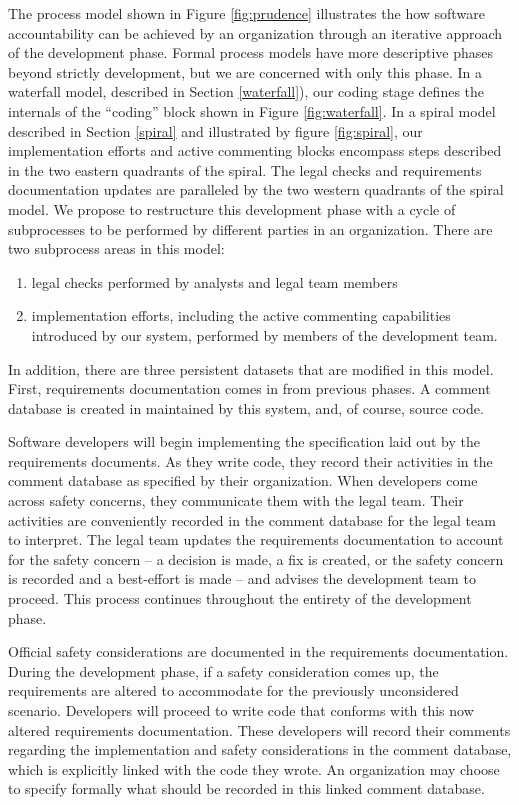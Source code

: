 The process model shown in Figure \ref{fig:prudence} illustrates the how
software accountability can be achieved by an organization through an iterative
approach of the development phase. Formal process models have more
descriptive phases beyond strictly development, but we are concerned with only
this phase. In a waterfall model, described in Section \ref{waterfall}), our
coding stage defines the internals of the ``coding'' block shown in Figure 
\ref{fig:waterfall}. In a spiral model described in Section \ref{spiral} and 
illustrated by figure \ref{fig:spiral}, our implementation efforts and active
commenting blocks encompass steps described in the two eastern quadrants of the
spiral. The legal checks and requirements documentation updates are paralleled 
by the two western quadrants of the spiral model. We propose to restructure this
development phase with a cycle of subprocesses to be performed by different
parties in an organization. There are two subprocess areas in this model: 
\begin{enumerate}
  \item legal checks performed by analysts and legal team members
  \item implementation efforts, including the active commenting capabilities 
  introduced by our system, performed by members of the development team.
\end{enumerate}
In addition, there are three persistent datasets that are modified in this
model. First, requirements documentation comes in from previous phases. A 
comment database is created in maintained by this system, and, of course, source
code.

Software developers will begin implementing the specification laid out by the
requirements documents. As they write code, they record their activities in the
comment database as specified by their organization. When developers come across
safety concerns, they communicate them with the legal team. Their activities are
conveniently recorded in the comment database for the legal team to interpret.
The legal team updates the requirements documentation to account for the safety
concern -- a decision is made, a fix is created, or the safety concern is
recorded and a best-effort is made -- and advises the development team to
proceed. This process continues throughout the entirety of the development
phase.

Official safety considerations are documented in the requirements documentation.
During the development phase, if a safety consideration comes up, the
requirements are altered to accommodate for the previously unconsidered
scenario. Developers will proceed to write code that conforms with this now
altered requirements documentation. These developers will record their comments
regarding the implementation and safety considerations in the comment database,
which is explicitly linked with the code they wrote. An organization may choose
to specify formally what should be recorded in this linked comment database.
